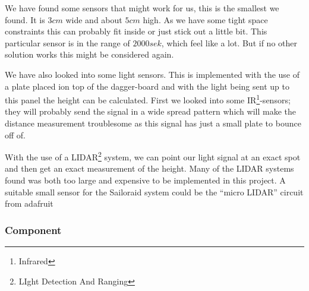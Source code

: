 We have found some sensors that might work for us, this is the smallest we found. It is $3cm$ wide and about $5cm$ high. As we have some tight space constraints this can probably fit inside or just stick out a little bit. This particular sensor is in the range of $2000sek$, which feel like a lot. But if no other solution works this might be considered again.  


We have also looked into some light sensors. This is implemented with the use of a plate placed ion top of the dagger-board and with the light being sent up to this panel the height can be calculated. First we looked into some IR\footnote{Infrared}-sensors; they will probably send the signal in a wide spread pattern which will make the distance measurement troublesome as this signal has just a small plate to bounce off of.  
  
With the use of a LIDAR\footnote{LIght Detection And Ranging} system, we can point our light signal at an exact spot and then get an exact measurement of the height.  
Many of the LIDAR systems found was both too large and expensive to be implemented in this project.
A suitable small sensor for the Sailoraid system could be the ``micro LIDAR'' circuit from adafruit%

\subsubsection{Component}%


